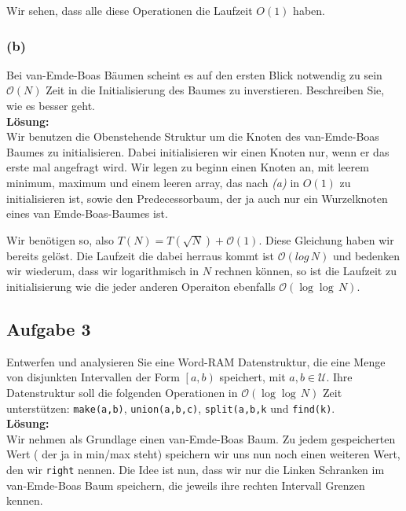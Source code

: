 \documentclass[11pt,a4paper,ngerman]{article}
\begin{document}
Wir sehen, dass alle diese Operationen die Laufzeit $O(1)$ haben.
\subsubsection*{(b)}

Bei van-Emde-Boas  Bäumen scheint es auf den ersten Blick notwendig zu sein $\mathcal{O}(N)$ Zeit in die Initialisierung des Baumes zu inverstieren. Beschreiben Sie, wie es besser geht.\\

\noindent\textbf{Lösung:}\\

Wir benutzen die Obenstehende Struktur um die Knoten des van-Emde-Boas Baumes zu initialisieren. Dabei initialisieren wir einen Knoten nur,
wenn er das erste mal angefragt wird. Wir legen zu beginn einen Knoten an, mit leerem minimum, maximum und einem leeren array,
das nach \emph{(a)} in $O(1)$ zu initialisieren ist, sowie den Predecessorbaum, der ja auch nur ein Wurzelknoten eines van Emde-Boas-Baumes ist.

Wir benötigen so, also $T(N) = T(\sqrt{N}) + \mathcal{O}(1)$. Diese Gleichung haben wir bereits gelöst. Die Laufzeit die dabei herraus kommt ist $\mathcal{O}(log \, N)$ und bedenken wir wiederum, dass wir logarithmisch in $N$ rechnen können, so ist die Laufzeit zu initialisierung wie die jeder anderen Operaiton ebenfalls $\mathcal{O}(\log \log \, N)$.

\subsection*{Aufgabe 3}

Entwerfen und analysieren Sie eine Word-RAM Datenstruktur, die eine Menge von disjunkten Intervallen der Form $\left[a,b\right)$ speichert, mit $a,b \in \mathcal{U}$. Ihre Datenstruktur soll die folgenden Operationen in $\mathcal{O}(\log\log \, N)$ Zeit unterstützen: \lstinline|make(a,b)|, \lstinline|union(a,b,c)|, \lstinline|split(a,b,k| und \lstinline|find(k)|.\\

\noindent\textbf{Lösung:}\\

Wir nehmen als Grundlage einen van-Emde-Boas Baum. Zu jedem gespeicherten Wert ( der ja in min/max steht) speichern wir uns nun noch einen weiteren Wert, den wir \lstinline|right| nennen. Die Idee ist nun, dass wir nur die Linken Schranken im van-Emde-Boas Baum speichern, die jeweils ihre rechten Intervall Grenzen kennen.\\
\end{document}

